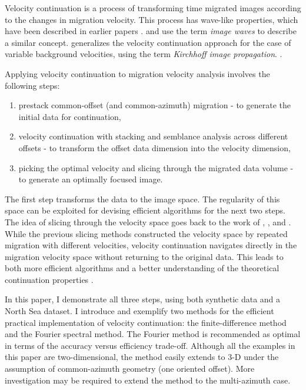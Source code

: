 Velocity continuation is a process of transforming time migrated images
according to the changes in migration velocity. This process has wave-like
properties, which have been described in earlier papers
\cite[]{me,SEG-1997-1762,first}.  \cite{hubral} and
\cite{GEO62-02-05890597} use the term \emph{image waves} to describe a
similar concept. \cite{adlerSEG,adler} generalizes the velocity
continuation approach for the case of variable background velocities, using
the term \emph{Kirchhoff image propagation}.  
\cite[]{SEG-1999-17231726,SEG-2000-08740877}.

\par
Applying velocity continuation to migration velocity analysis involves
the following steps: 
\begin{enumerate}
\item prestack common-offset (and common-azimuth) migration - to
  generate the initial data for continuation,
\item velocity continuation with stacking and semblance analysis across
  different offsets - to transform the offset data dimension into the velocity
  dimension,
\item picking the optimal velocity and slicing through the migrated
  data volume - to generate an optimally focused image.
\end{enumerate}
The first step transforms the data to the image space. The regularity of this
space can be exploited for devising efficient algorithms for the next two
steps. The idea of slicing through the velocity space goes back to the work of
\cite{shurtleff}, \cite{SEG-1984-S1.8,Fowler.sepphd.58}, and
\cite{GEO57-01-00510059}. While the previous slicing methods constructed
the velocity space by repeated migration with different velocities, velocity
continuation navigates directly in the migration velocity space without
returning to the original data. This leads to both more efficient algorithms
and a better understanding of the theoretical continuation properties
\cite[]{first}.

In this paper, I demonstrate all three steps, using both synthetic data and a
North Sea dataset. I introduce and exemplify two methods for the efficient
practical implementation of velocity continuation: the finite-difference
method and the Fourier spectral method. The Fourier method is recommended as
optimal in terms of the accuracy versus efficiency trade-off. Although all the
examples in this paper are two-dimensional, the method easily extends to 3-D
under the assumption of common-azimuth geometry (one oriented offset). More
investigation may be required to extend the method to the multi-azimuth case.

